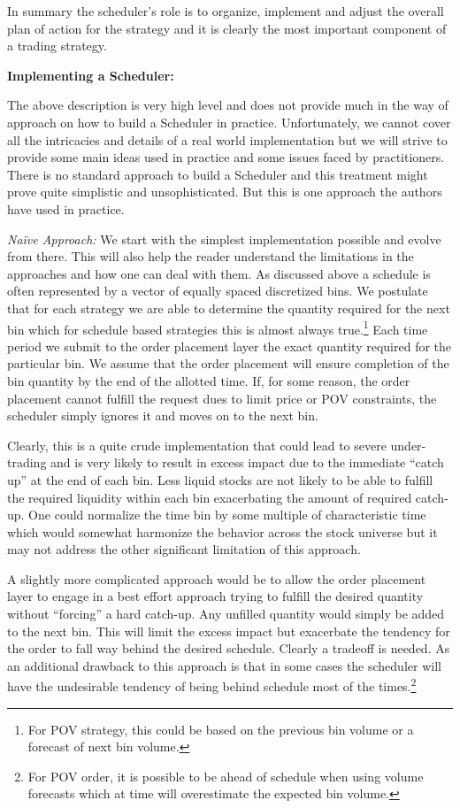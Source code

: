 In summary the scheduler's role is to organize, implement and adjust the overall plan of action for the strategy and it is clearly the most important component of a trading strategy. \twomedskip


\noindent\textbf{Implementing a Scheduler:} \twomedskip


The above description is very high level and does not provide much in the way of approach on how to build a Scheduler in practice. Unfortunately, we cannot cover all the intricacies and details of a real world implementation but we will strive to provide some main ideas used in practice and some issues faced by practitioners. There is no standard approach to build a Scheduler and this treatment might prove quite simplistic and unsophisticated. But this is one approach the authors have used in practice. \twomedskip


\noindent\emph{Na\"ive Approach:} We start with the simplest implementation possible and evolve from there. This will also help the reader understand the limitations in the approaches and how one can deal with them. As discussed above a schedule is often represented by a vector of equally spaced discretized bins. We postulate that for each strategy we are able to determine the quantity required for the next bin which for schedule based strategies this is almost always true.\footnote{For POV strategy, this could be based on the previous bin volume or a forecast of next bin volume.} Each time period we submit to the order placement layer the exact quantity required for the particular bin. We assume that the order placement will ensure completion of the bin quantity by the end of the allotted time. If, for some reason, the order placement cannot fulfill the request dues to limit price or POV constraints, the scheduler simply ignores it and moves on to the next bin. 


Clearly, this is a quite crude implementation that could lead to severe under-trading and is very likely to result in excess impact due to the immediate ``catch up'' at the end of each bin. Less liquid stocks are not likely to be able to fulfill the required liquidity within each bin exacerbating the amount of required catch-up. One could normalize the time bin by some multiple of characteristic time which would somewhat harmonize the behavior across the stock universe but it may not address the other significant limitation of this approach.


A slightly more complicated approach would be to allow the order placement layer to engage in a best effort approach trying to fulfill the desired quantity without ``forcing'' a hard catch-up. Any unfilled quantity would simply be added to the next bin. This will limit the excess impact but exacerbate the tendency for the order to fall way behind the desired schedule. Clearly a tradeoff is needed. As an additional drawback to this approach is that in some cases the scheduler will have the undesirable tendency of being behind schedule most of the times.\footnote{For POV order, it is possible to be ahead of schedule when using volume forecasts which at time will overestimate the expected bin volume.} \twomedskip


